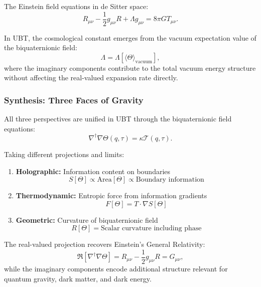 The Einstein field equations in de Sitter space:
\begin{equation}
R_{\mu\nu} - \frac{1}{2}g_{\mu\nu}R + \Lambda g_{\mu\nu} = 8\pi G T_{\mu\nu}.
\end{equation}

In UBT, the cosmological constant emerges from the vacuum expectation value of the biquaternionic field:
\begin{equation}
\Lambda = \Lambda[\langle\Theta\rangle_{\text{vacuum}}],
\end{equation}
where the imaginary components contribute to the total vacuum energy structure without affecting the real-valued expansion rate directly.

\subsubsection{Synthesis: Three Faces of Gravity}

All three perspectives are unified in UBT through the biquaternionic field equations:
\begin{equation}
\nabla^\dagger \nabla \Theta(q,\tau) = \kappa \mathcal{T}(q,\tau).
\end{equation}

Taking different projections and limits:
\begin{enumerate}
\item \textbf{Holographic:} Information content on boundaries
   \begin{equation}
   S[\Theta] \propto \text{Area}[\Theta] \propto \text{Boundary information}
   \end{equation}

\item \textbf{Thermodynamic:} Entropic force from information gradients
   \begin{equation}
   F[\Theta] = T \cdot \nabla S[\Theta]
   \end{equation}

\item \textbf{Geometric:} Curvature of biquaternionic field
   \begin{equation}
   R[\Theta] = \text{Scalar curvature including phase}
   \end{equation}
\end{enumerate}

The real-valued projection recovers Einstein's General Relativity:
\begin{equation}
\Re[\nabla^\dagger \nabla \Theta] = R_{\mu\nu} - \frac{1}{2}g_{\mu\nu}R = G_{\mu\nu},
\end{equation}
while the imaginary components encode additional structure relevant for quantum gravity, dark matter, and dark energy.

